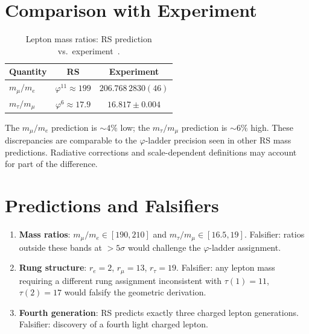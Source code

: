 \documentclass[12pt,a4paper]{article}
\theoremstyle{definition}
\theoremstyle{remark}
\begin{document}
\section{Comparison with Experiment}
\label{sec:comparison}

\begin{table}[h]
\centering
\caption{Lepton mass ratios: RS prediction vs.\ experiment~\cite{PDG}.}
\begin{tabular}{lcc}
\hline
Quantity & RS & Experiment \\
\hline
$m_\mu/m_e$ & $\varphi^{11} \approx 199$ & $206.768\,2830(46)$ \\
$m_\tau/m_\mu$ & $\varphi^{6} \approx 17.9$ & $16.817\pm 0.004$ \\
\hline
\end{tabular}
\end{table}

The $m_\mu/m_e$ prediction is $\sim 4\%$ low; the $m_\tau/m_\mu$
prediction is $\sim 6\%$ high.  These discrepancies are comparable
to the $\varphi$-ladder precision seen in other RS mass predictions.
Radiative corrections and scale-dependent definitions may account
for part of the difference.

\section{Predictions and Falsifiers}
\label{sec:predictions}

\begin{enumerate}[label=(\roman*)]
\item \textbf{Mass ratios}: $m_\mu/m_e \in [190, 210]$ and
$m_\tau/m_\mu \in [16.5, 19]$.  Falsifier: ratios outside these
bands at $> 5\sigma$ would challenge the $\varphi$-ladder assignment.

\item \textbf{Rung structure}: $r_e = 2$, $r_\mu = 13$, $r_\tau =
19$.  Falsifier: any lepton mass requiring a different rung
assignment inconsistent with $\tau(1) = 11$, $\tau(2) = 17$ would
falsify the geometric derivation.

\item \textbf{Fourth generation}: RS predicts exactly three charged
lepton generations.  Falsifier: discovery of a fourth light charged
lepton.
\end{enumerate}
\end{document}
